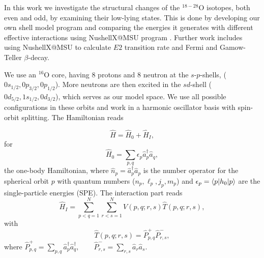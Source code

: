 \documentclass[aps,prl,reprint,groupedaddress]{revtex4-1}  %
\begin{document}
In this work we investigate the structural changes of the $^{18-28}$O isotopes, both even and odd, by examining their low-lying states. This is done by developing our own shell model program and comparing the energies it generates with different effective interactions using NushellX@MSU program \cite{Brown2014}. Further work includes using NushellX@MSU to calculate $E2$ transition rate and Fermi and Gamow-Teller $\beta$-decay.

We use an $^{16}$O core, having 8 protons and 8 neutron at the $s$-$p$-shells, ($0s_{1/2},0p_{3/2},0p_{1/2}$). 
More neutrons are then excited in the $sd$-shell ($0d_{5/2},1s_{1/2},0d_{3/2}$), which serves as our model space. We use all possible configurations in these orbits and work in a harmonic oscillator basis with spin-orbit splitting. 
The Hamiltonian reads

		\begin{equation} \label{eq:H}
		\hat H = \hat H_0 + \hat H_I,
		\end{equation}
for
		\begin{equation} \label{eq:H_0}
		\hat H_0 = \sum_{p,q} \epsilon_p \hat a_{p}^\dagger \hat a_{q},
		\end{equation}
the one-body Hamiltonian, where $\hat n_p = \hat a_p^\dagger \hat a_p$ is the number operator for the spherical orbit $p$ with quantum numbers ($n_p,\ell_p,j_p,m_p$) and $\epsilon_p = \braket{p|h_0|p}$ are the single-particle energies (SPE). The interaction part reads
		\begin{equation} \label{eq:V}
		\hat H_I = \sum_{p < q=1}^{N} \sum_{r < s=1}^{N} V(p,q;r,s) \hat T(p,q;r,s),
		\end{equation}
		with
		\begin{equation} \label{eq:P}
		\hat T(p,q;r,s)  = \hat P_{p,q}^+ \hat P_{r,s}^-,
		\end{equation}
where $\hat P_{p,q}^+ = \sum_{p,q} \hat a_p^\dagger \hat a_q^\dagger, \qquad
								  \hat P_{r,s}^- = \sum_{r,s} \hat a_r \hat a_s.$
\end{document}
